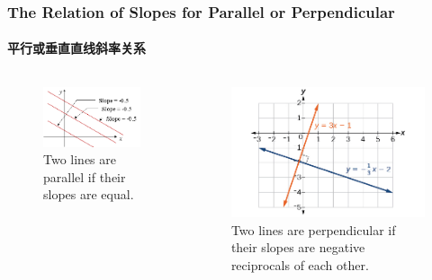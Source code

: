 \documentclass[
	11pt, %
]{beamer}
\begin{document}
\begin{frame}
	\frametitle{The Relation of Slopes for Parallel or Perpendicular }
	\framesubtitle{平行或垂直直线斜率关系}

	\begin{columns}[t] 
		\begin{column}{0.5\textwidth} %

			\begin{figure}
		    \includegraphics[width=\linewidth]{Parallel_Slopes.png}
		    \caption{Two lines are parallel if their slopes are equal.}
	   \end{figure}
		\end{column}

		\begin{column}{0.5\textwidth} %
			\begin{figure}
		    \includegraphics[width=\linewidth]{Perpendicular_Slopes.jpeg}
		    \caption{Two lines are perpendicular if their slopes are negative reciprocals of each other.}
	   \end{figure}
    \end{column}
	\end{columns}
\end{frame}
\end{document}
